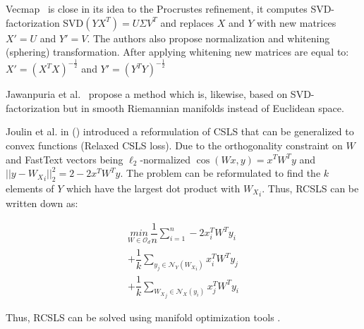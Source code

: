 \documentclass[11pt,a4paper]{article}
\begin{document}
Vecmap~\cite{vecmap} is close in its idea to the Procrustes refinement, it computes SVD-factorization SVD$(YX^T) = U\Sigma V^T$ and replaces $X$ and $Y$ with new matrices $X' = U$ and $Y' = V$. The authors also propose normalization and whitening (sphering) transformation. After applying whitening new matrices are equal to:
$X' = {({X^T}X)}^{-\tfrac{1}{2}}$ and $Y' = {({Y^T}Y)}^{-\tfrac{1}{2}}$

Jawanpuria et al.~\cite{jawanpuria} propose a method which is, likewise, based on SVD-factorization but in smooth Riemannian manifolds instead of Euclidean space.

Joulin et al. in (\citeyear{joulin2018loss}) introduced a reformulation of CSLS that can be generalized to convex functions (Relaxed CSLS loss). Due to the orthogonality constraint on $W$ and FastText vectors being $\ell_2$-normalized $\cos(Wx, y) = x^T W^Ty$ and $|| y - {W_X}_i ||^2_2 = 2 - 2x^TW^Ty$. The problem can be reformulated to find the $k$ elements of $Y$ which have the largest dot product with ${W_X}_i$. Thus, RCSLS can be written down as:

	\begin{align*}
	\underset{W \in  \mathcal O_d}{min} \dfrac{1}{n}\sum_{i=1}^{n} - 2x^T_iW^Ty_i \\
	+ \dfrac{1}{k} \sum_{y_j \in \mathcal{N}_Y({W_X}_i)}^{ } x_i^T W^Ty_j \\
	+ \dfrac{1}{k} \sum_{{W_X}_j \in \mathcal{N}_X(y_i)}^{ } x_j^T W^Ty_i
	\end{align*}

Thus, RCSLS can be solved using manifold optimization tools \cite{boumal2014manopt}.
\end{document}
